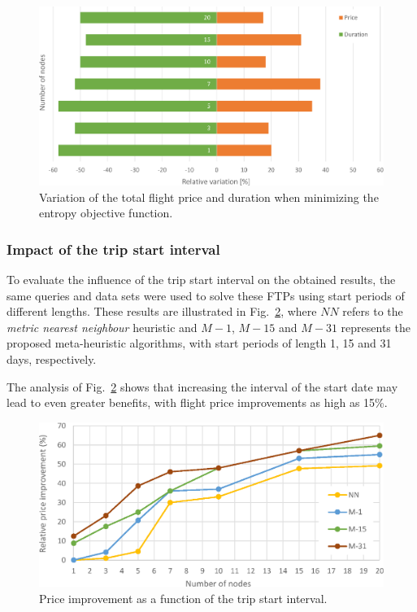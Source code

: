 \documentclass[onecolumn]{elsarticle}
\begin{document}
\begin{figure}
  \centering
  \includegraphics[width=1.0\columnwidth]{fig3.eps}
  \caption{Variation of the total flight price and duration when minimizing the entropy objective function.}
  \label{fig:cost_vs_time}  
\end{figure}


\subsubsection{Impact of the trip start interval}

To evaluate the influence of the trip start interval on the obtained results, the same queries and data sets were used to solve these FTPs using start periods of different lengths. These results are illustrated in Fig.~\ref{fig:cost_vs_startperiod}, where $NN$ refers to the \textit{metric nearest neighbour} heuristic and $M-1$, $M-15$ and $M-31$ represents the proposed meta-heuristic algorithms, with start periods of length 1, 15 and 31 days, respectively. 

The analysis of Fig.~\ref{fig:cost_vs_startperiod} shows that increasing the interval of the start date may lead to even greater benefits, with flight price improvements as high as 15\%.  

\begin{figure}[t]
  \centering
  \includegraphics[width=1.0\columnwidth]{fig4.eps}
  \caption{Price improvement as a function of the trip start interval.}
  \label{fig:cost_vs_startperiod}  
\end{figure}
\end{document}
